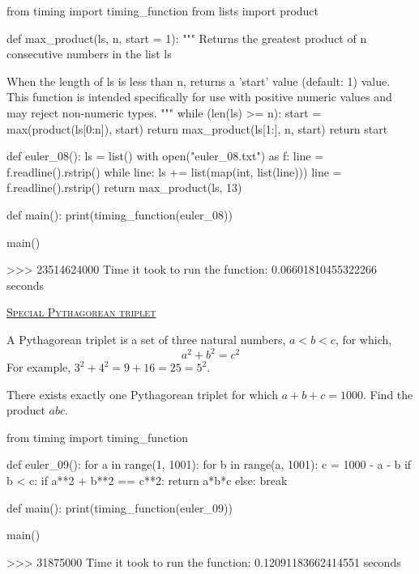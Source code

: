 \documentclass[11pt]{article}
\begin{document}
\begin{code}
from timing import timing_function
from lists import product

def max_product(ls, n, start = 1):
    """
    Returns the greatest product  of n consecutive numbers in the list ls

    When the length of ls is less than n, returns a 'start' value (default: 1) value.
    This function is intended specifically for use with positive numeric values and may
    reject non-numeric types.
    """
    while (len(ls) >= n):
        start = max(product(ls[0:n]), start)
        return max_product(ls[1:], n, start)
    return start
    
def euler_08():
    ls = list()
    with open("euler_08.txt") as f:
        line = f.readline().rstrip()
        while line:
            ls += list(map(int, list(line)))
            line = f.readline().rstrip()
        return max_product(ls, 13)

def main():
    print(timing_function(euler_08))

main()
\end{code}
{\color{blue}
\begin{shell}
>>> 
23514624000
Time it took to run the function: 0.06601810455322266 seconds    
\end{shell}
}
\noindent
\href{https://projecteuler.net/problem=9}{\textsc{Special Pythagorean triplet}}\par\noindent
A Pythagorean triplet is a set of three natural numbers, $a < b < c$, for which,
\begin{equation*}
a^2 + b^2 = c^2  
\end{equation*}
For example, $3^2 + 4^2 = 9 + 16 = 25 = 5^2$.
\par
There exists exactly one Pythagorean triplet for which $a + b + c = 1000$.
Find the product $abc$.

\begin{code}
from timing import timing_function

def euler_09():
    for a in range(1, 1001):
        for b in range(a, 1001):
            c = 1000 - a - b
            if b < c:
                if a**2 + b**2 == c**2:
                    return a*b*c
            else:
                break

def main():
    print(timing_function(euler_09))

main()
\end{code}
{\color{blue}
\begin{shell}
>>> 
31875000
Time it took to run the function: 0.12091183662414551 seconds
\end{shell}
}
\end{document}

